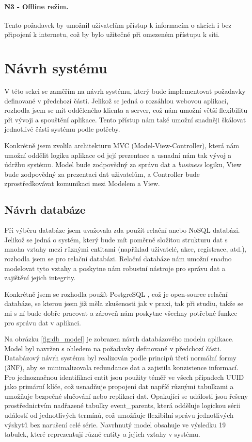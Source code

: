 \paragraph{N3 - Offline režim.}\label{req:N3}
Tento požadavek by umožnil uživatelům přístup k informacím
o akcích i bez připojení k internetu, což by bylo užitečné při omezeném přístupu k síti.

\section{Návrh systému}
V této sekci se zaměřím na návrh systému, který bude implementovat požadavky definované v předchozí části. 
Jelikož se jedná o rozsáhlou webovou aplikaci, rozhodla jsem se mít odděleného klienta a server, což nám umožní větší flexibilitu při vývoji a spouštění aplikace. Tento přístup nám také umožní snadněji škálovat jednotlivé části systému podle potřeby. 

Konkrétně jsem zvolila architekturu MVC (Model-View-Controller), která nám umožní oddělit logiku aplikace od její prezentace a usnadní nám tak vývoj a údržbu systému. Model bude zodpovědný za správu dat a \textit{business} logiku, View bude zodpovědný za prezentaci dat uživatelům, a Controller bude zprostředkovávat komunikaci mezi Modelem a View. \cite{mvc}

\subsection{Návrh databáze}
Při výběru databáze jsem uvažovala zda použít relační anebo NoSQL databázi. Jelikož se jedná o systém, který bude mít poměrně složitou strukturu dat s mnoha vztahy mezi různými entitami (například uživatelé, akce, registrace, atd.), rozhodla jsem se pro relační databázi. Relační databáze nám umožní snadno modelovat tyto vztahy a poskytne nám robustní nástroje pro správu dat a zajištění jejich integrity.

Konkrétně jsem se rozhodla použít PostgreSQL \cite{postgresql_website}, což je open-source relační databáze, se kterou jsem již měla zkušenosti jak v praxi, tak při studiu, takže se mi s ní bude dobře pracovat a zároveň nám poskytne všechny potřebné funkce pro správu dat v aplikaci.

Na obrázku \ref{fig:db_model} je zobrazen návrh databázového modelu aplikace. Model byl navržen s ohledem na požadavky definované v předchozí části.
Databázový návrh systému byl realizován podle principů třetí normální formy (3NF), 
aby se minimalizovala redundance dat a zajistila konzistence informací. 
Pro jednoznačnou identifikaci entit jsou použity téměř ve všech případech UUID jako primární klíče, což usnadňuje 
propojení dat napříč různými tabulkami a umožňuje bezpečné slučování nebo replikaci dat. 
Opakující se události jsou řešeny prostřednictvím nadřazené tabulky event\_parents, 
která odděluje logickou sérii událostí od jednotlivých termínů, což umožňuje flexibilní správu 
jednotlivých výskytů bez narušení celé série.
Navrhnutý model obsahuje ve výsledku 19 tabulek, které reprezentují různé entity a jejich vztahy v systému. 

